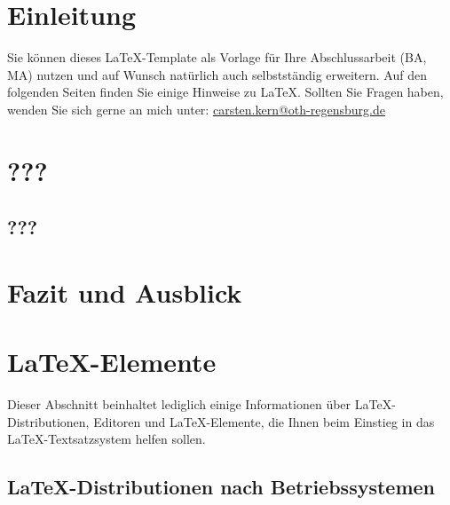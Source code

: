 \documentclass[12pt,a4paper,bibliography=totocnumbered,listof=totocnumbered]{article}
\begin{document}
\section{Einleitung}
Sie können dieses \LaTeX-Template als Vorlage für Ihre Abschlussarbeit (\ac{BA}, \ac{MA}) nutzen und auf Wunsch natürlich auch selbstständig erweitern. Auf den folgenden Seiten finden Sie einige Hinweise zu \LaTeX. Sollten Sie Fragen haben, wenden Sie sich gerne an mich unter: \url{carsten.kern@oth-regensburg.de} 



\pagebreak
\section{???}
\subsection{???}


\section{Fazit und Ausblick}



\pagebreak
\section{\LaTeX-Elemente}
Dieser Abschnitt beinhaltet lediglich einige Informationen über \LaTeX-Distributionen, Editoren und \LaTeX-Elemente, die Ihnen beim Einstieg in das \LaTeX-Textsatzsystem helfen sollen.

\subsection{\LaTeX-Distributionen nach Betriebssystemen}
\end{document}
